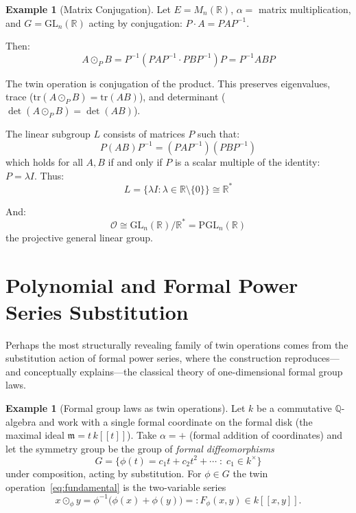 \documentclass[11pt,a4paper,openany]{book}
\theoremstyle{plain}
\theoremstyle{definition}
\newtheorem{example}[theorem]{Example}
\newcommand{\twing}[1]{\odot_{#1}}
\newcommand{\opspace}{\mathcal{O}}
\newcommand{\lingroup}{L}
\newcommand{\actspace}{E}
\newcommand{\groupG}{G}
\newcommand{\RR}{\mathbb{R}}
\newcommand{\GL}{\mathrm{GL}}
\newcommand{\PGL}{\mathrm{PGL}}
\newcommand{\tr}{\mathrm{tr}}
\begin{document}
\begin{example}[Matrix Conjugation]\label{ex:matrix-similarity}
Let $\actspace = M_n(\RR)$, $\alpha = $ matrix multiplication, and $\groupG = \GL_n(\RR)$ acting by conjugation: $P \cdot A = PAP^{-1}$.

Then:
\[
A \twing{P} B = P^{-1}(PAP^{-1} \cdot PBP^{-1})P = P^{-1}ABP
\]

The twin operation is conjugation of the product. This preserves eigenvalues, trace ($\tr(A \twing{P} B) = \tr(AB)$), and determinant ($\det(A \twing{P} B) = \det(AB)$).

The linear subgroup $\lingroup$ consists of matrices $P$ such that:
\[
P(AB)P^{-1} = (PAP^{-1})(PBP^{-1})
\]
which holds for all $A, B$ if and only if $P$ is a scalar multiple of the identity: $P = \lambda I$. Thus:
\[
\lingroup = \{\lambda I : \lambda \in \RR \setminus \{0\}\} \cong \RR^*
\]

And:
\[
\opspace \cong \GL_n(\RR) / \RR^* = \PGL_n(\RR)
\]
the projective general linear group.
\end{example}

\section{Polynomial and Formal Power Series Substitution}\label{sec:ex-formal}

Perhaps the most structurally revealing family of twin operations comes from the substitution action of formal power series, where the construction reproduces---and conceptually explains---the classical theory of one-dimensional formal group laws.

\begin{example}[Formal group laws as twin operations]\label{ex:formal-groups}
Let $k$ be a commutative $\mathbb{Q}$-algebra and work with a single formal coordinate on the formal disk (the maximal ideal $\mathfrak{m}=t\,k[[t]]$). Take $\alpha=+$ (formal addition of coordinates) and let the symmetry group be the group of \emph{formal diffeomorphisms}
\[
\groupG=\{\phi(t)=c_1 t+c_2 t^2+\cdots \;:\; c_1\in k^\times\}
\]
under composition, acting by substitution. For $\phi\in\groupG$ the twin operation~\eqref{eq:fundamental} is the two-variable series
\[
x\twing{\phi}y=\phi^{-1}\big(\phi(x)+\phi(y)\big)=:F_\phi(x,y)\in k[[x,y]].
\]
\end{example}
\end{document}
